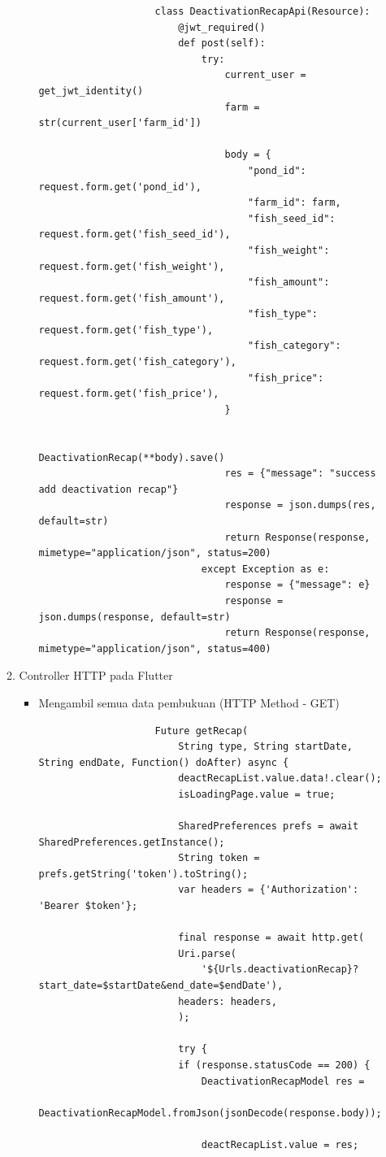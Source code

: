 \begin{spacing}{1.5}
\begin{enumerate}
\begin{enumerate}
\begin{itemize}
				\begin{lstlisting}
					class DeactivationRecapApi(Resource):
						@jwt_required()
						def post(self):
							try:
								current_user = get_jwt_identity()
								farm = str(current_user['farm_id'])
					
								body = {
									"pond_id": request.form.get('pond_id'),
									"farm_id": farm,
									"fish_seed_id": request.form.get('fish_seed_id'),
									"fish_weight": request.form.get('fish_weight'),
									"fish_amount": request.form.get('fish_amount'),
									"fish_type": request.form.get('fish_type'),
									"fish_category": request.form.get('fish_category'),
									"fish_price": request.form.get('fish_price'),
								}
					
								DeactivationRecap(**body).save()
								res = {"message": "success add deactivation recap"}
								response = json.dumps(res, default=str)
								return Response(response, mimetype="application/json", status=200)
							except Exception as e:
								response = {"message": e}
								response = json.dumps(response, default=str)
								return Response(response, mimetype="application/json", status=400)
				\end{lstlisting}
			\end{itemize}
			
			\item Controller HTTP pada Flutter

			\begin{itemize}
				\item Mengambil semua data pembukuan (HTTP Method - GET)
				
				\begin{lstlisting}
					Future getRecap(
						String type, String startDate, String endDate, Function() doAfter) async {
						deactRecapList.value.data!.clear();
						isLoadingPage.value = true;

						SharedPreferences prefs = await SharedPreferences.getInstance();
						String token = prefs.getString('token').toString();
						var headers = {'Authorization': 'Bearer $token'};

						final response = await http.get(
						Uri.parse(
							'${Urls.deactivationRecap}?start_date=$startDate&end_date=$endDate'),
						headers: headers,
						);

						try {
						if (response.statusCode == 200) {
							DeactivationRecapModel res =
								DeactivationRecapModel.fromJson(jsonDecode(response.body));

							deactRecapList.value = res;


\end{lstlisting}
\end{itemize}
\end{enumerate}
\end{enumerate}
\end{spacing}
